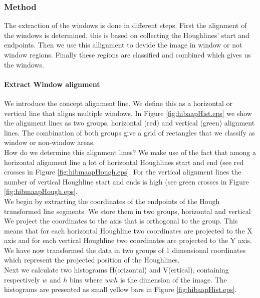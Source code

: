 \subsubsection{Method}
The extraction of the windows is done in different steps. 
First the alignment of the windows is determined, this is based on collecting
the Houghlines' start and endpoints. Then we use this allignment to devide the
image in window or not window regions.  Finally these regions are classified
and combined which gives us the windows.


\paragraph{Extract Window alignment}
We introduce the concept alignment line. We define this as a horizontal or
vertical line that aligns multiple windows. In Figure
\ref{fig:hibaapHist.eps}
we show the alignment lines as two groups, horizontal (red) and
vertical (green) alignment lines.  The combination of both groups give a grid of
rectangles that we classify as window or non-window areas.\\

How do we determine this alignment lines? We make use of the fact that among a
horizontal alignment line a lot of horizontal Houghlines start and end (see red
crosses in Figure \ref{fig:hibmaapHough.eps}. For the vertical alignment lines
the number of vertical Houghline start and ends is high (see green crosses in
Figure \ref{fig:hibmaapHough.eps}.\\

We begin by extracting the coordinates of the endpoints of the Hough transformed line
segments. We store them in two groups, horizontal and vertical%
We project the coordinates to the axis that is orthogonal to the group. This
means that for each horizontal Houghline two coordinates are projected to the X
axis and for each vertical Houghline two coordinates are projected to the Y
axis. We have now transformed the data in two groups of 1 dimensional
coordinates which represent the projected position of the Houghlines.\\

Next we calculate two histograms H(orizontal) and V(ertical), containing respectively
$w$ and $h$ bins where $w x h$ is the dimension of the image.  The histograms
are presented as small yellow bars in Figure \ref{fig:hibaapHist.eps}.

